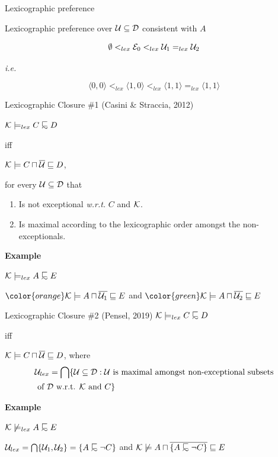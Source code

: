 \documentclass[10pt]{beamer}
\begin{document}
\begin{frame}[fragile]{Lexicographic preference}

Lexicographic preference over $\mathcal{U} \subseteq \mathcal{D}$ consistent with $A$

{\Large
$$\emptyset <_{lex} \mathcal{E}_0 <_{lex} \mathcal{U}_1 =_{lex} \mathcal{U}_2$$
}

\textit{i.e.}

{\Large
$$\langle 0, 0 \rangle <_{lex} \langle 1, 0 \rangle <_{lex} \langle 1, 1 \rangle =_{lex} \langle 1, 1 \rangle$$
}
\end{frame}

\begin{frame}[fragile]{Lexicographic Closure \#1 (Casini \& Straccia, 2012)}

  $\Kmc \models_{lex} C \definc D$ 
  
  iff 
  
  $\mathcal{K} \models C \sqcap \overline{\mathcal{U}} \sqsubseteq D$, 
  
  for every $\mathcal{U} \subseteq \mathcal{D}$ that 
  
  \begin{enumerate}
    \item Is not exceptional \textit{w.r.t.\xspace} $C$ and $\mathcal{K}$.
    \item Is maximal according to the lexicographic order amongst the non-exceptionals.
  \end{enumerate} 

  \pause 

  \textbf{Example}

  $\Kmc \models_{lex} A \definc E$ 

  ${\color{orange}\Kmc \models A \sqcap \overline{\Umc_1} \sqsubseteq E}$ and ${\color{green}\Kmc \models A \sqcap \overline{\Umc_2} \sqsubseteq E}$

\end{frame}

\begin{frame}[fragile]{Lexicographic Closure \#2 (Pensel, 2019)}
  $\Kmc \models_{lex} C \definc D$ 
  
  iff 
  
  $\mathcal{K} \models C \sqcap \overline{\mathcal{U}} \sqsubseteq D$, where
  \begin{align*}
    &\Umc_{lex} = \bigcap \{\Umc \subseteq \Dmc : \Umc \text{ is maximal amongst non-exceptional subsets} \\ 
    &\text{ of \Dmc w.r.t. \Kmc and } C\}
  \end{align*}

  \pause 

  \textbf{Example}

  $\Kmc \not \models_{lex} A \definc E$

  $\Umc_{lex} = \bigcap \{\Umc_1, \Umc_2\} = \{A \definc \lnot C\}$
  and
  $\Kmc \not\models A \sqcap \overline{\{A \definc \lnot C\}} \sqsubseteq E$
\end{frame}
\end{document}
